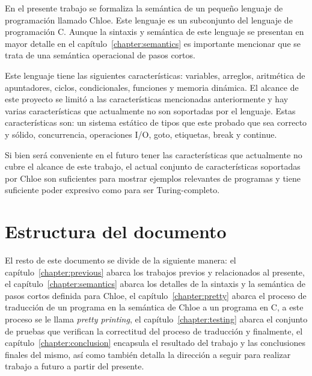 En el presente trabajo se formaliza la semántica de un pequeño lenguaje de programación llamado Chloe.
Este lenguaje es un subconjunto del lenguaje de programación C.
Aunque la sintaxis y semántica de este lenguaje se presentan en mayor detalle en el capítulo~\ref{chapter:semantics} es importante mencionar que se trata de una semántica operacional de pasos cortos.

Este lenguaje tiene las siguientes características: variables, arreglos, aritmética de apuntadores, ciclos, condicionales, funciones y memoria dinámica.
El alcance de este proyecto se limitó a las características mencionadas anteriormente y hay varias características que actualmente no son soportadas por el lenguaje.
Estas características son: un sistema estático de tipos que este probado que sea correcto y sólido, concurrencia, operaciones I/O, goto, etiquetas, break y continue.

Si bien será conveniente en el futuro tener las características que actualmente no cubre el alcance de este trabajo, el actual conjunto de características soportadas por Chloe son suficientes para mostrar ejemplos relevantes de programas y tiene suficiente poder expresivo como para ser Turing-completo.


\section{Estructura del documento}\label{section:document_structure}

El resto de este documento se divide de la siguiente manera: el capítulo~\ref{chapter:previous} abarca los trabajos previos y relacionados al presente, el capítulo~\ref{chapter:semantics} abarca los detalles de la sintaxis y la semántica de pasos cortos definida para Chloe, el capítulo~\ref{chapter:pretty} abarca el proceso de traducción de un programa en la semántica de Chloe a un programa en C, a este proceso se le llama \textit{pretty printing}, el capítulo~\ref{chapter:testing} abarca el conjunto de pruebas que verifican la correctitud del proceso de traducción y finalmente, el capítulo~\ref{chapter:conclusion} encapsula el resultado del trabajo y las conclusiones finales del mismo, así como también detalla la dirección a seguir para realizar trabajo a futuro a partir del presente.

